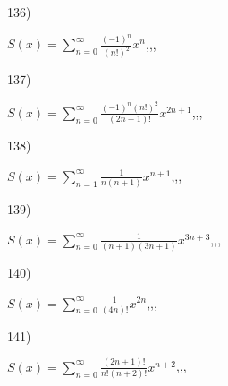 \documentclass[11pt, ukrainian]{article}
\begin{document}
\par
\vspace{0.9cm}
136) \space 
{%
{$S(x)=\sum\limits_{n=0}^{\infty}{\frac{(-1)^n}{(n!)^2}}{x^{{n}}}$},,, \par \smallskip  
}
\par
\vspace{0.9cm}
137) \space 
{%
{$S(x)=\sum\limits_{n=0}^{\infty}{\frac{{(-1)^n}{(n!)^2}}{(2n+1)!}}{x^{{2n+1}}}$},,, \par \smallskip  
}
\par
\vspace{0.9cm}
138) \space 
{%
{$S(x)=\sum\limits_{n=1}^{\infty}{\frac{1}{n(n+1)}}{x^{{n+1}}}$},,, \par \smallskip  
}
\par
\vspace{0.9cm}
139) \space 
{%
{$S(x)=\sum\limits_{n=0}^{\infty}{\frac{1}{(n+1)(3n+1)}}{x^{{3n+3}}}$},,, \par \smallskip  
}
\par
\vspace{0.9cm}
140) \space 
{%
{$S(x)=\sum\limits_{n=0}^{\infty}{\frac{1}{(4n)!}}{x^{{2n}}}$},,, \par \smallskip  
}
\par
\newpage
141) \space 
{%
{$S(x)=\sum\limits_{n=0}^{\infty}{\frac{(2n+1)!}{n!(n+2)!}}{x^{{n+2}}}$},,, \par \smallskip  
}
\end{document}
